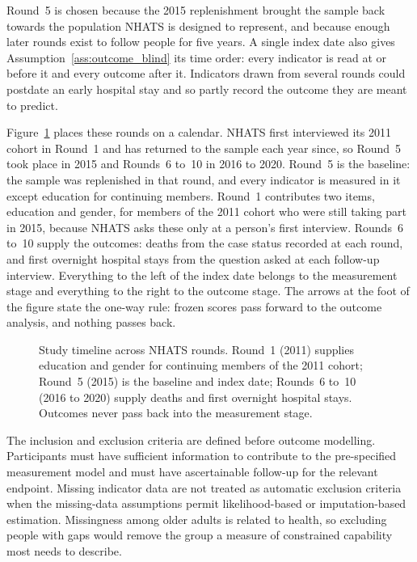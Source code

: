 Round~5 is chosen because the 2015 replenishment brought the sample back towards the population NHATS is designed to represent, and because enough later rounds exist to follow people for five years. A single index date also gives Assumption~\ref{ass:outcome_blind} its time order: every indicator is read at or before it and every outcome after it. Indicators drawn from several rounds could postdate an early hospital stay and so partly record the outcome they are meant to predict.

Figure~\ref{fig:methods-timeline} places these rounds on a calendar. NHATS first interviewed its 2011 cohort in Round~1 and has returned to the sample each year since, so Round~5 took place in 2015 and Rounds~6 to~10 in 2016 to 2020. Round~5 is the baseline: the sample was replenished in that round, and every indicator is measured in it except education for continuing members. Round~1 contributes two items, education and gender, for members of the 2011 cohort who were still taking part in 2015, because NHATS asks these only at a person's first interview. Rounds~6 to~10 supply the outcomes: deaths from the case status recorded at each round, and first overnight hospital stays from the question asked at each follow-up interview. Everything to the left of the index date belongs to the measurement stage and everything to the right to the outcome stage. The arrows at the foot of the figure state the one-way rule: frozen scores pass forward to the outcome analysis, and nothing passes back.

\begin{figure}[htbp]
\centering

\caption[Study timeline across NHATS rounds]{Study timeline across NHATS rounds. Round~1 (2011) supplies education and gender for continuing members of the 2011 cohort; Round~5 (2015) is the baseline and index date; Rounds~6 to~10 (2016 to 2020) supply deaths and first overnight hospital stays. Outcomes never pass back into the measurement stage.}
\label{fig:methods-timeline}
\end{figure}

The inclusion and exclusion criteria are defined before outcome modelling. Participants must have sufficient information to contribute to the pre-specified measurement model and must have ascertainable follow-up for the relevant endpoint. Missing indicator data are not treated as automatic exclusion criteria when the missing-data assumptions permit likelihood-based or imputation-based estimation. Missingness among older adults is related to health, so excluding people with gaps would remove the group a measure of constrained capability most needs to describe.

